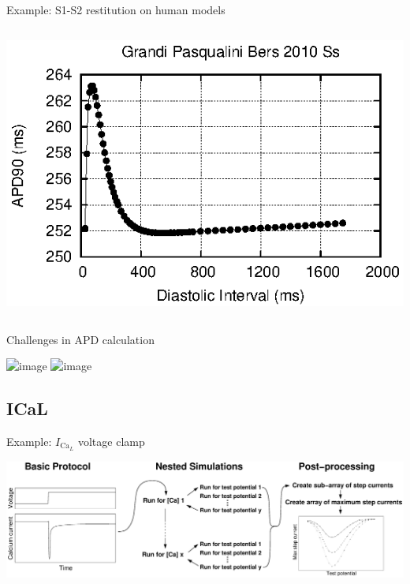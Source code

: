 \documentclass[t,xcolor={usenames,dvipsnames}]{beamer}
\begin{document}
\begin{frame}{Example: S1-S2 restitution on human models}
\begin{columns}[T]
\begin{column}{.33\linewidth}
\begin{center}
\vspace{.1cm}
\includegraphics[width=\textwidth]{grandi_pasqualini_bers_2010_ss_s1s2_curve}
\end{center}
\end{column}
\end{columns}
\end{frame}


\begin{frame}{Challenges in APD calculation}
\begin{center}
\includegraphics<1>{faber_rudy_2000_s1s2_curve}
\includegraphics<2>[height=.9\textheight]{faber_rudy_2000_COR_comparison}
\end{center}
\end{frame}


\subsection*{ICaL}

\begin{frame}{Example: $I_{\textrm{Ca}_L}$ voltage clamp}
\begin{center}
\includegraphics[width=\textwidth]{ICaLIntro}
\end{center}
\end{frame}
\end{document}
